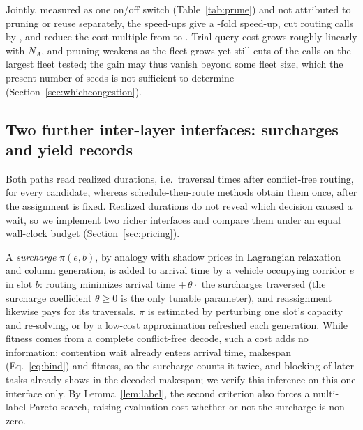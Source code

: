 Jointly, measured as one on/off switch (Table~\ref{tab:prune}) and not attributed to pruning or reuse separately, the speed-ups give a \SpeedupProbe{}-fold speed-up, cut routing calls by \RouteCallCut{}, and reduce the cost multiple from \CostMultBefore{} to \CostMultAfter{}.
Trial-query cost grows roughly linearly with $N_A$, and pruning weakens as the fleet grows yet still cuts \RouteCallCutLo{} of the calls on the largest fleet tested; the gain may thus vanish beyond some fleet size, which the present number of seeds is not sufficient to determine (Section~\ref{sec:whichcongestion}).

\subsection{Two further inter-layer interfaces: surcharges and yield records}
\label{sec:interface}\label{sec:ls}

Both paths read realized durations, i.e.\ traversal times after conflict-free routing, for every candidate, whereas schedule-then-route methods obtain them once, after the assignment is fixed.
Realized durations do not reveal which decision caused a wait, so we implement two richer interfaces and compare them under an equal wall-clock budget (Section~\ref{sec:pricing}).

A \emph{surcharge} $\pi(e,b)$, by analogy with shadow prices in Lagrangian relaxation and column generation, is added to arrival time by a vehicle occupying corridor $e$ in slot $b$: routing minimizes arrival time $+\,\theta\cdot$ the surcharges traversed (the surcharge coefficient $\theta\ge0$ is the only tunable parameter), and reassignment likewise pays for its traversals.
$\pi$ is estimated by perturbing one slot's capacity and re-solving, or by a low-cost approximation refreshed each generation.
While fitness comes from a complete conflict-free decode, such a cost adds no information: contention wait already enters arrival time, makespan (Eq.~\eqref{eq:bind}) and fitness, so the surcharge counts it twice, and blocking of later tasks already shows in the decoded makespan; we verify this inference on this one interface only.
By Lemma~\ref{lem:label}, the second criterion also forces a multi-label Pareto search, raising evaluation cost whether or not the surcharge is non-zero.

